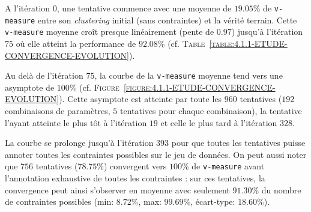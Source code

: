 			A l'itération $0$, une tentative commence avec une moyenne de $19.05$\% de \texttt{v-measure}  entre son \textit{clustering} initial (sans contraintes) et la vérité terrain.
			Cette \texttt{v-measure} moyenne croît presque linéairement (pente de $0.97$) jusqu'à l'itération $75$ où elle atteint la performance de $92.08$\% (cf. \textsc{Table~\ref{table:4.1.1-ETUDE-CONVERGENCE-EVOLUTION}}).

			Au delà de l'itération $75$, la courbe de la \texttt{v-measure} moyenne tend vers une asymptote de $100$\% (cf. \textsc{Figure~\ref{figure:4.1.1-ETUDE-CONVERGENCE-EVOLUTION}}).
			Cette asymptote est atteinte par toute les $960$ tentatives ($192$ combinaisons de paramètres, $5$ tentatives pour chaque combinaison), la tentative l'ayant atteinte le plus tôt à l'itération $19$ et celle le plus tard à l'itération $328$.
			
			La courbe se prolonge jusqu'à l'itération $393$ pour que toutes les tentatives puisse annoter toutes les contraintes possibles sur le jeu de données.
			On peut aussi noter que $756$ tentatives ($78.75$\%) convergent vers $100$\% de \texttt{v-measure} avant l'annotation exhaustive de toutes les contraintes : sur ces tentatives, la convergence peut ainsi s'observer en moyenne avec seulement $91.30$\% du nombre de contraintes possibles (min: $8.72$\%, max: $99.69$\%, écart-type: $18.60$\%).
			
